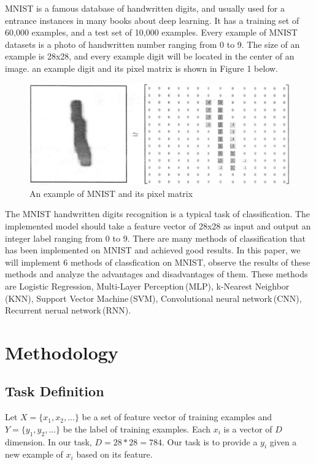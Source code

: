 \documentclass[sigchi]{acmart}
\begin{document}
MNIST is a famous database of handwritten digits, and usually used for a entrance instances in many books about deep learning.\cite{lecun-mnisthandwrittendigit-2010} It has a training set of 60,000 examples, and a test set of 10,000 examples. Every example of MNIST datasets is a photo of handwritten number ranging from 0 to 9. The size of an example is 28x28, and every example digit will be located in the center of an image. an example digit and its pixel matrix is shown in Figure 1 below. 

\begin{figure}[h]
  \centering
  \includegraphics[width=\linewidth]{digit_example.png}
  \caption{An example of MNIST and its pixel matrix}
\end{figure}

The MNIST handwritten digits recognition is a typical task of classification. The implemented model should take a feature vector of 28x28 as input and output an integer label ranging from 0 to 9. There are many methods of classification that has been implemented on MNIST and achieved good results. In this paper, we will implement 6 methods of classfication on MNIST, observe the results of these methods and analyze the advantages and disadvantages of them. These methods are Logistic Regression, Multi-Layer Perception\,(MLP), k-Nearest Neighbor\,(KNN), Support Vector Machine\,(SVM), Convolutional neural network\,(CNN), Recurrent nerual network\,(RNN).


\section{Methodology}

\subsection{Task Definition}
Let $X = \{x_1,x_2,...\}$ be a set of feature vector of training examples and $Y = \{y_1,y_2,...\}$ be the label of training examples. Each $x_i$ is a vector of $D$ dimension. In our task, $D = 28 * 28 = 784$. Our task is to provide a $y_i$ given a new example of $x_i$ based on its feature.
\end{document}
